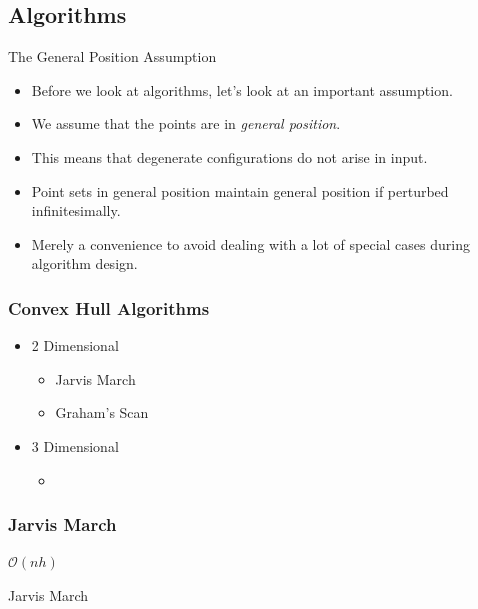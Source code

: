 \documentclass{beamer}
\begin{document}
    \subsection{Algorithms}
    \begin{frame}{The General Position Assumption}
        \begin{itemize}
            \item Before we look at algorithms, let's look at an important 
            assumption. 
            \item We assume that the points are in \emph{general position}.
            \item This means that degenerate configurations do not arise in input. 
            \item Point sets in general position maintain general position if perturbed infinitesimally. 
            \item Merely a convenience to avoid dealing with a lot of special cases during algorithm design.
        \end{itemize}
    \end{frame}

    \begin{frame}
      \frametitle{Convex Hull Algorithms}
      \begin{itemize}
        \item 2 Dimensional
        \begin{itemize}
          \item Jarvis March
          \item Graham's Scan
        \end{itemize}
        \item 3 Dimensional 
        \begin{itemize}
          \item 
        \end{itemize}
      \end{itemize}
    \end{frame}
    
    \begin{frame}
      \frametitle{Jarvis March}
      
    \begin{center}
      $\mathcal{O}(nh)$
    \end{center}
  \end{frame}
  
  \begin{frame}{Jarvis March}
  \end{frame}
  
\end{document}
